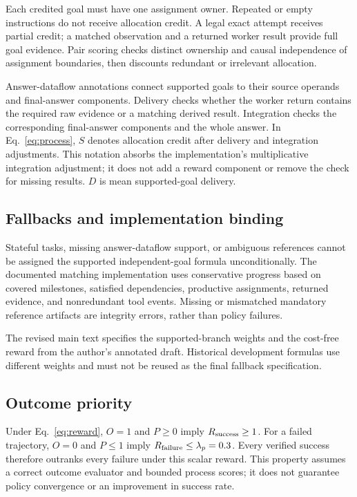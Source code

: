Each credited goal must have one assignment owner. Repeated or empty instructions do not receive allocation credit. A legal exact attempt receives partial credit; a matched observation and a returned worker result provide full goal evidence. Pair scoring checks distinct ownership and causal independence of assignment boundaries, then discounts redundant or irrelevant allocation.

Answer-dataflow annotations connect supported goals to their source operands and final-answer components. Delivery checks whether the worker return contains the required raw evidence or a matching derived result. Integration checks the corresponding final-answer components and the whole answer. In Eq.~\ref{eq:process}, $S$ denotes allocation credit after delivery and integration adjustments. This notation absorbs the implementation's multiplicative integration adjustment; it does not add a reward component or remove the check for missing results. $D$ is mean supported-goal delivery.

\subsection{Fallbacks and implementation binding}

Stateful tasks, missing answer-dataflow support, or ambiguous references cannot be assigned the supported independent-goal formula unconditionally. The documented matching implementation uses conservative progress based on covered milestones, satisfied dependencies, productive assignments, returned evidence, and nonredundant tool events. Missing or mismatched mandatory reference artifacts are integrity errors, rather than policy failures.

The revised main text specifies the supported-branch weights and the cost-free reward from the author's annotated draft. Historical development formulas use different weights and must not be reused as the final fallback specification. 

\subsection{Outcome priority}

Under Eq.~\ref{eq:reward}, $O=1$ and $P\geq0$ imply $R_{\rm success}\geq1$. For a failed trajectory, $O=0$ and $P\leq1$ imply $R_{\rm failure}\leq\lambda_p=0.3$. Every verified success therefore outranks every failure under this scalar reward. This property assumes a correct outcome evaluator and bounded process scores; it does not guarantee policy convergence or an improvement in success rate.

